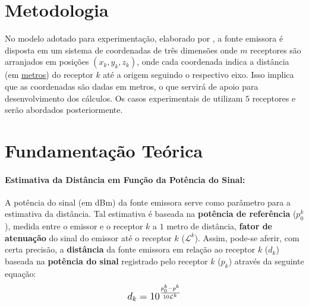 	\section{Metodologia}
	\label{sec:metodologia}
	No modelo adotado para experimentação, elaborado por \cite{polidorio:triangulacao}, a fonte emissora é disposta
	em um sistema de coordenadas de três dimensões onde $m$ receptores são arranjados em posições $(x_k, y_k, z_k)$, onde
	cada coordenada indica a distância (em \underline{metros}) do receptor $k$ até a origem seguindo o respectivo eixo. Isso implica que as coordenadas
	são dadas em metros, o que servirá de apoio para desenvolvimento dos cálculos.
	Os casos experimentais de \cite{polidorio:triangulacao} utilizam $5$ receptores e serão abordados posteriormente.

	\section{Fundamentação Teórica}
	\label{sec:fund_teor}

	\paragraph{Estimativa da Distância em Função da Potência do Sinal:}
	A potência do sinal (em dBm) da fonte emissora serve como parâmetro para a estimativa da distância.
	Tal estimativa é baseada na \textbf{potência de referência} ($p^k_0$), medida entre o emissor e o receptor $k$ a $1$ metro de distância,
	\textbf{fator de atenuação} do sinal do emissor até o receptor $k$ ($\mathcal{L}^k$). Assim, pode-se aferir, com certa precisão, a \textbf{distância} da fonte emissora em relação ao receptor $k$
	($d_k$) baseada na \textbf{potência do sinal} registrado pelo receptor $k$ ($p_k$) através da seguinte equação:
	\begin{align}
		\mathlarger{d_k = 10^{\frac{p^k_0 - p^k}{10\mathcal{L}^k}}} \label{eq:distancia}
	\end{align}


